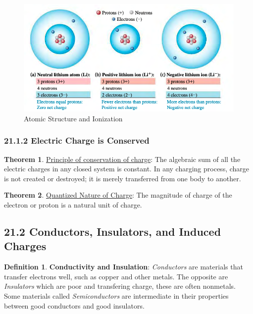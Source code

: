 \documentclass[12pt]{amsart}
\theoremstyle{definition}
\newtheorem{theorem}{Theorem}  %
\newtheorem{definition}{Definition} %
\numberwithin{equation}{theorem}    %
\begin{document}
\begin{figure}[H]
    \centering
    \includegraphics[width=5in]{Media/Atomic.png}
    \caption{Atomic Structure and Ionization}
    \label{Atomic Structure and Ionization}
\end{figure}

\subsubsection*{21.1.2 Electric Charge is Conserved}

\begin{theorem}
    \underline{Principle of conservation of charge}:
    The algebraic sum of all the electric charges in any closed system is 
    constant. In any charging process, charge is not created or destroyed; 
    it is merely transferred from one body to another.
\end{theorem}

\begin{theorem}
    \underline{Quantized Nature of Charge}:
    The magnitude of charge of the electron or proton is a natural unit of charge.
\end{theorem}

\subsection*{21.2 Conductors, Insulators, and Induced Charges}
\begin{definition}
    \textbf{Conductivity and Insulation}: 
    \textit{Conductors} are materials that transfer electrons well, such as 
    copper and other metals. The opposite are \textit{Insulators} which are 
    poor and transfering charge, these are often nonmetals. Some materials 
    called \textit{Semiconductors} are intermediate in their properties between
    good conductors and good insulators.
\end{definition}
\end{document}
